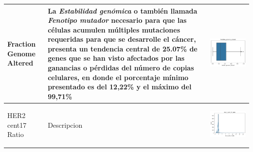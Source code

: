 \begin{table}[!htb]
\begin{threeparttable}
\begin{tabular}{p{2.5cm} p{7cm} p{6.5cm}}
			Fraction Genome Altered
			& La \textit{Estabilidad genómica} o también llamada \textit{Fenotipo mutador} necesario para que las células acumulen múltiples mutaciones requeridas para que se desarrolle el cáncer, presenta un tendencia central de 25.07\% de genes que se han visto afectados por las ganancias o pérdidas del número de copias celulares, en donde el porcentaje mínimo presentado es del 12,22\% y el máximo del 99,71\%
			
			& \begin{center}\includegraphics[width=1\linewidth]{NOTEBOOK/IMAGENES_DESCRIPTIVAS/17_fraction_genome_altered}\end{center}
			\\ \hline
			
			HER2 cent17 Ratio
			&Descripcion
			& \begin{center}\includegraphics[width=1\linewidth]{NOTEBOOK/IMAGENES_DESCRIPTIVAS/18_her_2_cent_17_ratio}\end{center}
			\\ \hline
		\end{tabular}
	\end{threeparttable}
\end{table}











